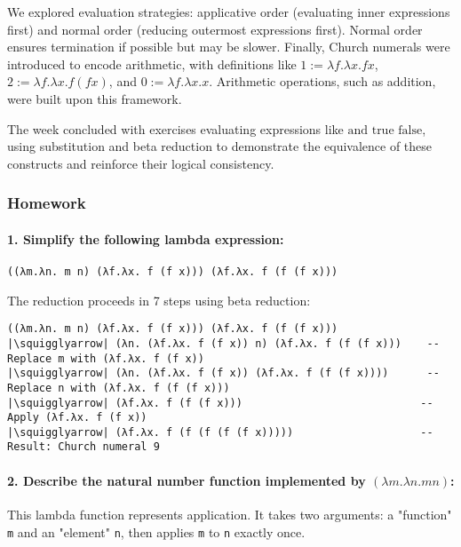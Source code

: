 \documentclass{article}
\newcommand{\squigglyarrow}{\textcolor{black}{$\leadsto$}}  %
\theoremstyle{theorem}
\theoremstyle{definition}
\theoremstyle{remark}
\begin{document}
We explored evaluation strategies: applicative order (evaluating inner expressions first) and normal order (reducing outermost expressions first). Normal order ensures termination if possible but may be slower. Finally, Church numerals were introduced to encode arithmetic, with definitions like \( 1 := \lambda f. \lambda x. fx \), \( 2 := \lambda f. \lambda x. f(fx) \), and \( 0 := \lambda f. \lambda x. x \). Arithmetic operations, such as addition, were built upon this framework.

The week concluded with exercises evaluating expressions like \( \text{and true false} \), using substitution and beta reduction to demonstrate the equivalence of these constructs and reinforce their logical consistency.


\subsubsection*{Homework}

\paragraph{1. Simplify the following lambda expression:}

\begin{verbatim}
((λm.λn. m n) (λf.λx. f (f x))) (λf.λx. f (f (f x)))
\end{verbatim}

The reduction proceeds in 7 steps using beta reduction:

\begin{verbatim}
((λm.λn. m n) (λf.λx. f (f x))) (λf.λx. f (f (f x)))
|\squigglyarrow| (λn. (λf.λx. f (f x)) n) (λf.λx. f (f (f x)))    -- Replace m with (λf.λx. f (f x))
|\squigglyarrow| (λn. (λf.λx. f (f x)) (λf.λx. f (f (f x))))      -- Replace n with (λf.λx. f (f (f x)))
|\squigglyarrow| (λf.λx. f (f (f x)))                            -- Apply (λf.λx. f (f x))
|\squigglyarrow| (λf.λx. f (f (f (f (f x)))))                    -- Result: Church numeral 9
\end{verbatim}

\paragraph{2. Describe the natural number function implemented by \((λm.λn. m n)\):} 

\leavevmode

This lambda function represents application. It takes two arguments: a "function" \texttt{m} and an "element" \texttt{n}, then applies \texttt{m} to \texttt{n} exactly once.
\end{document}
